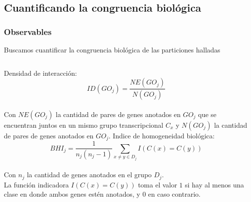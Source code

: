 \documentclass[serif,9pt, t]{beamer}
\begin{document}
\subsection{Cuantificando la congruencia biológica}
\begin{frame}\frametitle{Observables} 
\centering
Buscamos cuantificar la congruencia biológica de las particiones halladas
\bigskip
\begin{columns}[T]
Densidad de interacción:\\
\bigskip
\begin{equation}
ID(GO_j) = \frac{NE(GO_j)}{N(GO_j)}
\end{equation}\\
\bigskip
Con $NE(GO_j)$ la cantidad de pares de genes anotados en $GO_j$ que se encuentran juntos en un mismo grupo transcripcional $C_x$ y $N(GO_j)$ la cantidad de pares de genes anotados en $GO_j$.
Indice de homogeneidad biológica:\\
\bigskip
\begin{equation}
BHI_j = \frac{1}{n_j(n_j-1)}\sum\limits_{x\neq y\in D_j}I(C(x)=C(y))
\end{equation}\\
\medskip	
Con $n_j$ la cantidad de genes anotados en el grupo $D_j$.\\
La función indicadora $I(C(x)=C(y))$ toma el valor $1$ si hay al menos una clase en donde ambos genes estén anotados, y $0$ en caso contrario.
\end{columns}
\end{frame}
\end{document}
